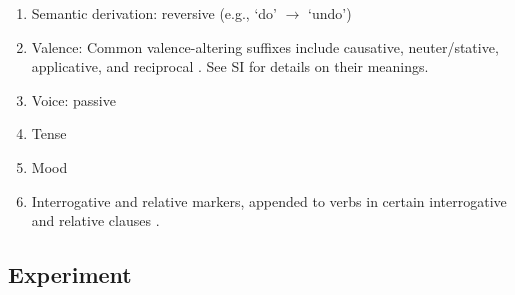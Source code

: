 \begin{enumerate}
\item Semantic derivation: reversive (e.g., `do' $\rightarrow$ `undo') \cite[]{doke1967textbook}
\item Valence: Common valence-altering suffixes include causative, neuter/stative, applicative, and reciprocal \cite[--338]{doke1967textbook}. See SI for details on their meanings.
    \item Voice: passive \cite[]{doke1967textbook} 
    \item Tense \cite[]{doke1967textbook}
    \item Mood \cite[--445]{doke1967textbook}
    \item Interrogative and relative markers, appended to verbs in certain interrogative and relative clauses \cite[, 271, 320, 714, 793]{doke1967textbook}.
\end{enumerate}





\subsection{Experiment}
